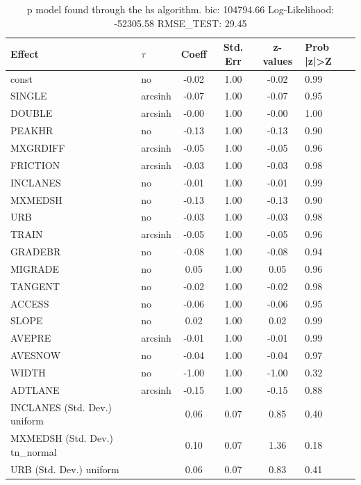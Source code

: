 \begin{table}
	\caption{p model found through the hs algorithm. bic: 104794.66 Log-Likelihood: -52305.58 RMSE_TEST: 29.45}
	\begin{center}
		\begin{tabular}{|l|l|c|c|c|l|}
			\hline
			Effect & $\tau$ & Coeff & Std. Err & z-values & Prob |z|>Z \\
			\hline
			const & no & -0.02 & 1.00 & -0.02 & 0.99 \\
			\hline
			SINGLE & arcsinh & -0.07 & 1.00 & -0.07 & 0.95 \\
			\hline
			DOUBLE & arcsinh & -0.00 & 1.00 & -0.00 & 1.00 \\
			\hline
			PEAKHR & no & -0.13 & 1.00 & -0.13 & 0.90 \\
			\hline
			MXGRDIFF & arcsinh & -0.05 & 1.00 & -0.05 & 0.96 \\
			\hline
			FRICTION & arcsinh & -0.03 & 1.00 & -0.03 & 0.98 \\
			\hline
			INCLANES & no & -0.01 & 1.00 & -0.01 & 0.99 \\
			\hline
			MXMEDSH & no & -0.13 & 1.00 & -0.13 & 0.90 \\
			\hline
			URB & no & -0.03 & 1.00 & -0.03 & 0.98 \\
			\hline
			TRAIN & arcsinh & -0.05 & 1.00 & -0.05 & 0.96 \\
			\hline
			GRADEBR & no & -0.08 & 1.00 & -0.08 & 0.94 \\
			\hline
			MIGRADE & no & 0.05 & 1.00 & 0.05 & 0.96 \\
			\hline
			TANGENT & no & -0.02 & 1.00 & -0.02 & 0.98 \\
			\hline
			ACCESS & no & -0.06 & 1.00 & -0.06 & 0.95 \\
			\hline
			SLOPE & no & 0.02 & 1.00 & 0.02 & 0.99 \\
			\hline
			AVEPRE & arcsinh & -0.01 & 1.00 & -0.01 & 0.99 \\
			\hline
			AVESNOW & no & -0.04 & 1.00 & -0.04 & 0.97 \\
			\hline
			WIDTH & no & -1.00 & 1.00 & -1.00 & 0.32 \\
			\hline
			ADTLANE & arcsinh & -0.15 & 1.00 & -0.15 & 0.88 \\
			\hline
			INCLANES (Std. Dev.) uniform &  & 0.06 & 0.07 & 0.85 & 0.40 \\
			\hline
			MXMEDSH (Std. Dev.) tn_normal &  & 0.10 & 0.07 & 1.36 & 0.18 \\
			\hline
			URB (Std. Dev.) uniform &  & 0.06 & 0.07 & 0.83 & 0.41 \\

\end{tabular}
\end{center}
\end{table}
